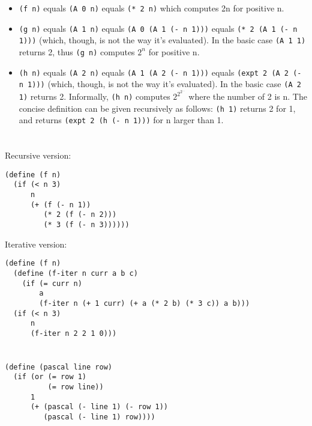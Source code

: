 \documentclass[../main.tex]{subfiles}
\begin{document}
\begin{itemize}
\item \lstinline{(f n)} equals \lstinline{(A 0 n)} equals \lstinline{(* 2 n)} which computes 2n for positive n.
\item \lstinline{(g n)} equals \lstinline{(A 1 n)} equals \lstinline{(A 0 (A 1 (- n 1)))} equals \lstinline{(* 2 (A 1 (- n 1)))} (which, though, is not the way it's evaluated). In the basic case \lstinline{(A 1 1)} returns 2, thus \lstinline{(g n)} computes $2^n$ for positive n.
\item \lstinline{(h n)} equals \lstinline{(A 2 n)} equals \lstinline{(A 1 (A 2 (- n 1)))} equals \lstinline{(expt 2 (A 2 (- n 1)))} (which, though, is not the way it's evaluated). In the basic case \lstinline{(A 2 1)} returns 2. Informally, \lstinline{(h n)} computes $2^{2^{2^{...}}}$ where the number of 2 is n. The concise definition can be given recursively as follows: \lstinline{(h 1)} returns 2 for 1, and returns \lstinline{(expt 2 (h (- n 1)))} for n larger than 1.
\end{itemize}


\section{}

Recursive version:

\begin{lstlisting}
(define (f n)
  (if (< n 3)
      n
      (+ (f (- n 1))
         (* 2 (f (- n 2)))
         (* 3 (f (- n 3))))))
\end{lstlisting}

Iterative version:

\begin{lstlisting}
(define (f n)
  (define (f-iter n curr a b c)
    (if (= curr n)
        a
        (f-iter n (+ 1 curr) (+ a (* 2 b) (* 3 c)) a b)))
  (if (< n 3)
      n
      (f-iter n 2 2 1 0)))
\end{lstlisting}


\section{}

\begin{lstlisting}
(define (pascal line row)
  (if (or (= row 1)
          (= row line))
      1
      (+ (pascal (- line 1) (- row 1))
         (pascal (- line 1) row))))
\end{lstlisting}
\end{document}
